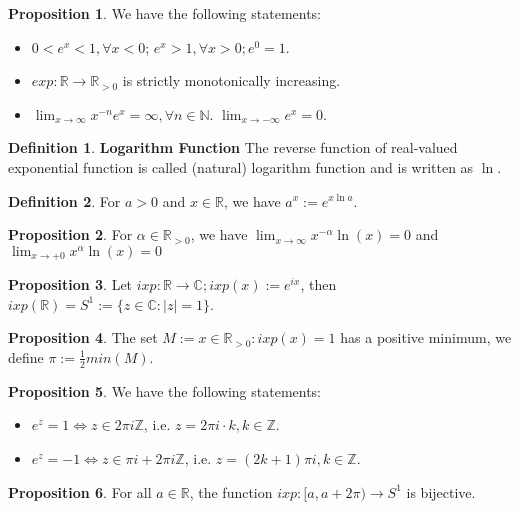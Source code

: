 \documentclass{article}
\theoremstyle{definition}
\newtheorem{defi}{Definition}[subsection]
\newtheorem{prop}{Proposition}[subsection]
\begin{document}
\begin{prop}
We have the following statements:
\begin{itemize}
    \item $0<e^x<1, \forall x<0$; $e^x>1, \forall x>0; e^0=1$.
    \item $exp: \mathbb{R}\to\mathbb{R}_{>0}$ is strictly monotonically increasing.
    \item $\lim_{x\to\infty}x^{-n}e^{x}=\infty, \forall n\in\mathbb{N}$. $\lim_{x\to-\infty}e^x=0$.
\end{itemize}
\end{prop}
\begin{defi}
\textbf{Logarithm Function} The reverse function of real-valued exponential function is called (natural) logarithm function and is written as $\ln$.
\end{defi}
\begin{defi}
For $a>0$ and $x\in\mathbb{R}$, we have $a^{x}:=e^{x\ln a}$.
\end{defi}
\begin{prop}
For $\alpha \in \mathbb{R}_{>0}$, we have $\lim_{x\to\infty}x^{-\alpha}\ln(x)=0$ and $\lim_{x\to +0}x^{\alpha}\ln(x)=0$
\end{prop}
\begin{prop}
Let $ixp: \mathbb{R}\to\mathbb{C}; ixp(x) := e^{ix}$, then $ixp(\mathbb{R})=S^{1} := \{z\in\mathbb{C}:|z|=1\}$.
\end{prop}
\begin{prop}
The set $M:={x\in\mathbb{R}_{>0}:ixp(x)=1}$ has a positive minimum, we define $\pi := \frac{1}{2}min(M)$.
\end{prop}
\begin{prop}
We have the following statements:
\begin{itemize}
    \item $e^z=1 \Leftrightarrow z\in 2\pi i\mathbb{Z}$, i.e. $z=2\pi i \cdot k, k\in\mathbb{Z}$.
    \item $e^z=-1 \Leftrightarrow z\in\pi i + 2\pi i\mathbb{Z}$, i.e. $z=(2k+1)\pi i, k\in\mathbb{Z}$.
\end{itemize}
\end{prop}
\begin{prop}
For all $a\in\mathbb{R}$, the function $ixp: [a, a+2\pi) \to S^{1}$ is bijective.
\end{prop}
\end{document}
